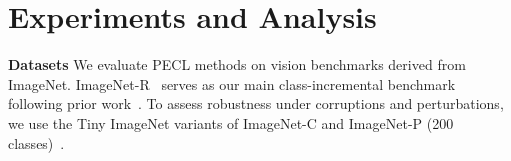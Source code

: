 \documentclass[10pt]{article} %
\begin{document}

\section{Experiments and Analysis}




\noindent\textbf{Datasets}\quad
We evaluate PECL methods on vision benchmarks derived from ImageNet. ImageNet-R~\cite{ImagenetR_Hendrycks_2021_ICCV} serves as our main class-incremental benchmark following prior work~\cite{liangInfLoRAInterferenceFreeLowRank2024a}.
To assess robustness under corruptions and perturbations, we use the Tiny ImageNet variants of ImageNet-C and ImageNet-P (200 classes)~\cite{hendrycks2018benchmarking}.

\end{document}
